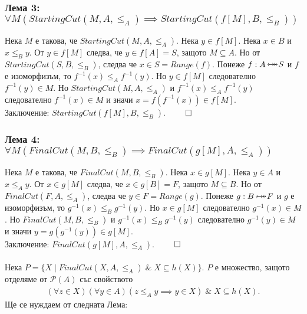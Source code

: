\documentclass[12pt]{article}
\newcommand{\bijection}[0]{\mathbin{\mathlarger{\mathlarger{\rightarrowtail}} \hspace{-14pt} \mathlarger{\mathlarger{\twoheadrightarrow}}}}
\begin{document}
\subsubsection*{Лема 3: \(\forall M (StartingCut(M, A, \leq_A) \implies StartingCut(f[M], B, \leq_B))\)}
Нека \(M\) е такова, че \(StartingCut(M, A, \leq_A)\).
Нека \(y \in f[M]\). Нека \(x \in B\) и \(x \leq_B y\).
От \(y \in f[M]\) следва, че \(y \in f[A] = S\), защото \(M \subseteq A\).
Но от \(StartingCut(S, B, \leq_B)\), следва че \(x \in S = Range(f)\).
Понеже \(f : A \bijection S\) и \(f\) е изоморфизъм, то \(f^{-1}(x) \leq_A f^{-1}(y)\).
Но \(y \in f[M]\) следователно \(f^{-1}(y) \in M\).
Но \(StartingCut(M, A, \leq_A)\) и \(f^{-1}(x) \leq_A f^{-1}(y)\)
следователно \(f^{-1}(x) \in M\) и значи \(x = f(f^{-1}(x)) \in f[M]\).
\\
Заключение: \(StartingCut(f[M], B, \leq_B)\). \(\qed\)

\subsubsection*{Лема 4: \(\forall M (FinalCut(M, B, \leq_B) \implies FinalCut(g[M], A, \leq_A))\)}
Нека \(M\) е такова, че \(FinalCut(M, B, \leq_B)\).
Нека \(x \in g[M]\). Нека \(y \in A\) и \(x \leq_A y\).
От \(x \in g[M]\) следва, че \(x \in g[B] = F\), защото \(M \subseteq B\).
Но от \(FinalCut(F, A, \leq_A)\), следва че \(y \in F = Range(g)\).
Понеже \(g : B \bijection F\) и \(g\) е изоморфизъм, то \(g^{-1}(x) \leq_B g^{-1}(y)\).
Но \(x \in g[M]\) следователно \(g^{-1}(x) \in M\).
Но \(FinalCut(M, B, \leq_B)\) и \(g^{-1}(x) \leq_B g^{-1}(y)\)
следователно \(g^{-1}(y) \in M\) и значи \(y = g(g^{-1}(y)) \in g[M]\).
\\
Заключение: \(FinalCut(g[M], A, \leq_A)\). \(\qed\)
\\
\vspace{1mm}
\\
Нека \(P = \{X \; | \; FinalCut(X, A, \leq_A) \; \& \; X \subseteq h(X) \}\).
\(P\) е множество, защото отделяме от \(\mathcal{P}(A)\) със свойството
\begin{align*}
(\forall z \in X)(\forall y \in A)(z \leq_A y \implies y \in X) \; \& \; X \subseteq h(X).
\end{align*}
Ще се нуждаем от следната Лема:
\end{document}
